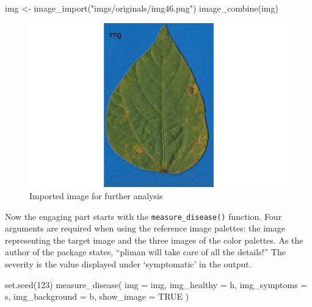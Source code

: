 \documentclass[
  letterpaper,
  DIV=11,
  numbers=noendperiod]{scrreprt}
\newenvironment{Shaded}{\begin{snugshade}}{\end{snugshade}}
\newcommand{\AttributeTok}[1]{\textcolor[rgb]{0.40,0.45,0.13}{#1}}
\newcommand{\ConstantTok}[1]{\textcolor[rgb]{0.56,0.35,0.01}{#1}}
\newcommand{\DecValTok}[1]{\textcolor[rgb]{0.68,0.00,0.00}{#1}}
\newcommand{\FunctionTok}[1]{\textcolor[rgb]{0.28,0.35,0.67}{#1}}
\newcommand{\NormalTok}[1]{\textcolor[rgb]{0.00,0.23,0.31}{#1}}
\newcommand{\OtherTok}[1]{\textcolor[rgb]{0.00,0.23,0.31}{#1}}
\newcommand{\StringTok}[1]{\textcolor[rgb]{0.13,0.47,0.30}{#1}}
\begin{document}
\begin{Shaded}
\begin{Highlighting}[]
\NormalTok{img }\OtherTok{\textless{}{-}} \FunctionTok{image\_import}\NormalTok{(}\StringTok{"imgs/originals/img46.png"}\NormalTok{)}
\FunctionTok{image\_combine}\NormalTok{(img)}
\end{Highlighting}
\end{Shaded}

\begin{figure}[H]

{\centering \includegraphics{data-actual-severity_files/figure-pdf/fig-img-1.pdf}

}

\caption{\label{fig-img}Imported image for further analysis}

\end{figure}

Now the engaging part starts with the \texttt{measure\_disease()}
function. Four arguments are required when using the reference image
palettes: the image representing the target image and the three images
of the color palettes. As the author of the package states, ``pliman
will take care of all the details!'' The severity is the value displayed
under `symptomatic' in the output.

\begin{Shaded}
\begin{Highlighting}[]
\FunctionTok{set.seed}\NormalTok{(}\DecValTok{123}\NormalTok{)}
\FunctionTok{measure\_disease}\NormalTok{(}
  \AttributeTok{img =}\NormalTok{ img,}
  \AttributeTok{img\_healthy =}\NormalTok{ h,}
  \AttributeTok{img\_symptoms =}\NormalTok{ s,}
  \AttributeTok{img\_background =}\NormalTok{ b,}
  \AttributeTok{show\_image =} \ConstantTok{TRUE}
\NormalTok{)}
\end{Highlighting}
\end{Shaded}
\end{document}
